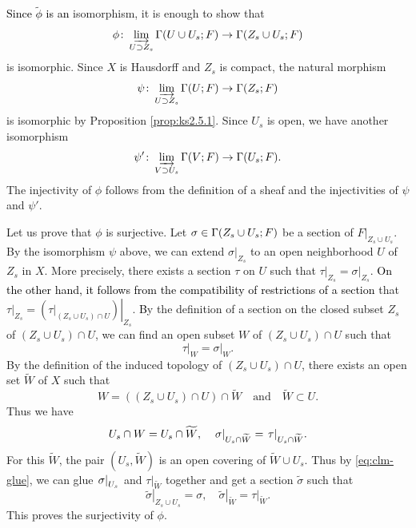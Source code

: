 ﻿\documentclass[a4paper,leqno,dvipdfmx]{jsarticle}
\makeatletter
\theoremstyle{definition}
\renewenvironment{proof}[1][\proofname]{\par
  \pushQED{\qed}%
  \normalfont \topsep6\p@\@plus6\p@\relax
  \trivlist
  \item[\hskip\labelsep
         \bfseries
    {#1}]\ignorespaces
}{%
  \popQED\endtrivlist\@endpefalse
}
\renewcommand{\proofname}{Proof.}
\numberwithin{equation}{section}
\newcommand{\indlim}[1][]{\mathop{\varinjlim}\limits_{#1}}
\newcommand{\mres}[2][]{{\left.{#1}\right\rvert}_{#2}}
\theoremstyle{mystyle}
\makeatother
\begin{document}
\begin{proof}[Proof of Lemma \ref{clm:ind-nonchar}]
  \textcolor{black}{Since \(\tilde{\phi}\) is an} isomorphism, 
  it is enough to show that
  \[
    \phi\colon\indlim[U\supset Z_{s}]
    \Gamma(U\cup U_{s};F)
    \to
    \Gamma(Z_{s}\cup U_{s};F)
  \]
  is isomorphic.     
  Since \(X\) is Hausdorff and \(Z_{s}\) is compact, 
  the natural morphism 
  \[
    \psi\colon\indlim[U\supset Z_{s}]\Gamma(U;F)
    \to
    \Gamma(Z_{s};F)
  \]
  is isomorphic by Proposition \ref{prop:ks2.5.1}. 
  Since \(U_{s}\) is open, we have another isomorphism 
  \[
    \psi'\colon\indlim[V\supset U_{s}]\Gamma(V;F)
    \to
    \Gamma(U_{s};F).
  \] 
  The injectivity of \(\phi\) follows from 
  the definition of a sheaf 
  and the injectivities of \(\psi\) and \(\psi'\). 

  Let us prove that \(\phi\) is surjective. 
  Let \(
    \sigma\in \Gamma(\textcolor{black}{Z_{s}\cup U_{s}};F)
  \) be a section of \(\mres[F]{Z_{s}\cup U_{s}}\). 
  By the isomorphism \(\psi\) above, 
  we can extend \(\mres[\sigma]{Z_{s}}\) to 
  an open neighborhood \(U\) of \(Z_{s}\) in \(X\). 
  More precisely, there exists a section 
  \(\tau\) on \(U\) such that \(
    \mres[\tau]{Z_{s}}=\mres[\sigma]{Z_{s}}
  \). 
  \textcolor{black}{On the other hand, 
  it follows from the compatibility of restrictions of a section} 
  that \(
    \mres[\tau]{Z_{s}}
    =
    \mres[{(\mres[\tau]{(Z_{s}\cup U_{s})\cap U})}]{Z_{s}}
  \). 
  \textcolor{black}
  {B}y the definition of a section 
  on the closed subset \(Z_{s}\) of 
  \((Z_{s}\cup U_{s})\cap U\), 
  we can find an open subset \(W\) of 
  \((Z_{s}\cup U_{s})\cap U\) 
  such that 
  \begin{equation*}
    \mres[\tau]{W}=\mres[\sigma]{W}. 
  \end{equation*}
  By the definition of the induced topology 
  of \((Z_{s}\cup U_{s})\cap U\), 
  there exists an open set \(\widetilde{W}\) of \(X\) 
  such that
  \[
    W=((Z_{s}\cup U_{s})\cap U)\cap \widetilde{W}
    \quad\text{and}\quad
    \widetilde{W}\subset U.
  \] 
  Thus we have 
  \begin{equation}\label{eq:clm-glue}
    \textcolor{black}{U_{s}\cap W = U_{s}\cap \widetilde{W},
    \quad
    \mres[\sigma]{U_{s}\cap \widetilde{W}}
    =\mres[\tau]{U_{s}\cap \widetilde{W}}.}
  \end{equation}
  For this \(\widetilde{W}\), 
  the pair \(
    \left(U_{s}, \widetilde{W}\right)
  \) is an open covering of \(\widetilde{W}\cup U_{s}\). 
  Thus by \eqref{eq:clm-glue}, we can 
  glue \(\textcolor{black}{\mres[\sigma]{U_{s}}}\) 
  and \(\mres[\tau]{\widetilde{W}}\) together 
  and get a section \(\widetilde{\sigma}\) such that \[
    \mres[\widetilde{\sigma}]{Z_{s}\cup U_{s}} 
    =\sigma, 
    \quad
    \mres[\widetilde{\sigma}]{\widetilde{W}}
    =\mres[\tau]{\widetilde{W}}.
  \]
  This proves the surjectivity of \(\phi\). 


\end{proof}
\end{document}
